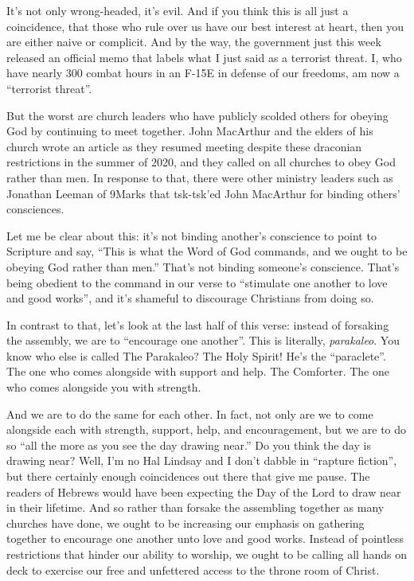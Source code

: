 \documentclass[letterpaper, 12pt]{article}
\begin{document}
    It's not only wrong-headed, it's evil. And if you think this is all
    just a coincidence, that those who rule over us have our best
    interest at heart, then you are either naive or complicit. And by
    the way, the government just this week released an official memo
    that labels what I just said as a terrorist threat. I, who have
    nearly 300 combat hours in an F-15E in defense of our freedoms, am
    now a ``terrorist threat''.

    But the worst are church leaders who have publicly scolded others
    for obeying God by continuing to meet together. John MacArthur and
    the elders of his church wrote an article as they resumed meeting
    despite these draconian restrictions in the summer of 2020, and they
    called on all churches to obey God rather than men. In response to
    that, there were other ministry leaders such as Jonathan Leeman of
    9Marks that tsk-tsk'ed John MacArthur for binding others'
    consciences. 

    Let me be clear about this: it's not binding another's conscience to
    point to Scripture and say, ``This is what the Word of God commands,
    and we ought to be obeying God rather than men.'' That's not binding
    someone's conscience. That's being obedient to the command in our
    verse to ``stimulate one another to love and good works'', and it's
    shameful to discourage Christians from doing so.

    In contrast to that, let's look at the last half of this verse:
    instead of forsaking the assembly, we are to ``encourage one
    another''. This is literally, \emph{parakaleo}. You know who else is
    called The Parakaleo? The Holy Spirit! He's the ``paraclete''. The
    one who comes alongside with support and help. The Comforter. The
    one who comes alongside you with strength.

    And we are to do the same for each other. In fact, not only are we
    to come alongside each with strength, support, help, and
    encouragement, but we are to do so ``all the more as you see the day
    drawing near.'' Do you think the day is drawing near? Well, I'm no
    Hal Lindsay and I don't dabble in ``rapture fiction'', but there
    certainly enough coincidences out there that give me pause. The
    readers of Hebrews would have been expecting the Day of the Lord to
    draw near in their lifetime. And so rather than forsake the
    assembling together as many churches have done, we ought to be
    increasing our emphasis on gathering together to encourage one
    another unto love and good works. Instead of pointless restrictions
    that hinder our ability to worship, we ought to be calling all hands
    on deck to exercise our free and unfettered access to the throne
    room of Christ.
\end{document}
